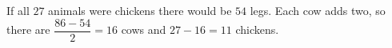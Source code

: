 If all $27$ animals were chickens there would be $54$ legs. Each cow adds two, so there are $\dfrac{86-54}{2}=16$ cows and $27-16=\boxed{11}$ chickens.

